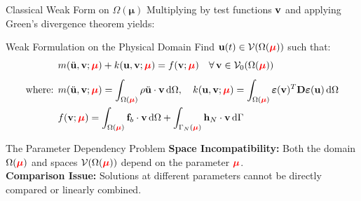 \begin{frame}{Classical Weak Form on $\Omega(\boldsymbol{\mu})$}
  Multiplying by test functions $\mathbf{v}$ and applying Green's divergence theorem yields:
  \begin{block}{Weak Formulation on the Physical Domain}
    \footnotesize
    Find $\mathbf{u}(t) \in \mathcal{V}(\Omega(\textcolor{red}{\boldsymbol{\mu}}))$ such that:
    \begin{align*}
      &m(\ddot{\mathbf{u}}, \mathbf{v}; \textcolor{red}{\boldsymbol{\mu}}) + k(\mathbf{u}, \mathbf{v}; \textcolor{red}{\boldsymbol{\mu}}) = f(\mathbf{v}; \textcolor{red}{\boldsymbol{\mu}}) \quad \forall\,\mathbf{v}\in\mathcal{V}_0(\Omega(\textcolor{red}{\boldsymbol{\mu}})) \\[4pt]
      \text{where: } &m(\ddot{\mathbf{u}},\mathbf{v};\textcolor{red}{\boldsymbol{\mu}}) = \int_{\Omega(\textcolor{red}{\boldsymbol{\mu}})} \rho \ddot{\mathbf{u}} \cdot \mathbf{v} \,\mathrm{d}\Omega, \quad k(\mathbf{u},\mathbf{v};\textcolor{red}{\boldsymbol{\mu}}) = \int_{\Omega(\textcolor{red}{\boldsymbol{\mu}})} \boldsymbol{\varepsilon}(\mathbf{v})^T \mathbf{D} \boldsymbol{\varepsilon}(\mathbf{u}) \,\mathrm{d}\Omega \\
      &f(\mathbf{v};\textcolor{red}{\boldsymbol{\mu}}) = \int_{\Omega(\textcolor{red}{\boldsymbol{\mu}})} \mathbf{f}_b \cdot \mathbf{v} \,\mathrm{d}\Omega + \int_{\Gamma_N(\textcolor{red}{\boldsymbol{\mu}})} \mathbf{h}_N \cdot \mathbf{v} \,\mathrm{d}\Gamma
    \end{align*}
  \end{block}
  \begin{alertblock}{The Parameter Dependency Problem}
    \footnotesize
    \textbf{Space Incompatibility:} Both the domain $\Omega(\textcolor{red}{\boldsymbol{\mu}})$ and spaces $\mathcal{V}(\Omega(\textcolor{red}{\boldsymbol{\mu}}))$ depend on the parameter $\textcolor{red}{\boldsymbol{\mu}}$. \\
    \textbf{Comparison Issue:} Solutions at different parameters cannot be directly compared or linearly combined.
  \end{alertblock}
\end{frame}

